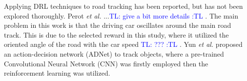 \documentclass{svproc}
\newcommand{\tl}[1]{\textcolor{blue} {TL: #1 :TL} }
\begin{document}
Applying DRL techniques to road tracking has been reported, but has not been explored thoroughly.  Perot \emph{et al.} %
\cite{Perot2017End} ...\tl{give a bit more details}. The main problem in this work is that the driving car oscillates around the main road track. This is due to the selected reward in this study, where it utilized the oriented angle of the road with the car speed \tl{???}. %
Yun \textit{et al.} \cite{Yun2017Action,Yun2018Action} proposed an action-decision network (ADNet) to track objects, %
where a pre-trained Convolutional Neural Network (CNN) was firstly employed then the reinforcement learning was utilized. 
\end{document}
